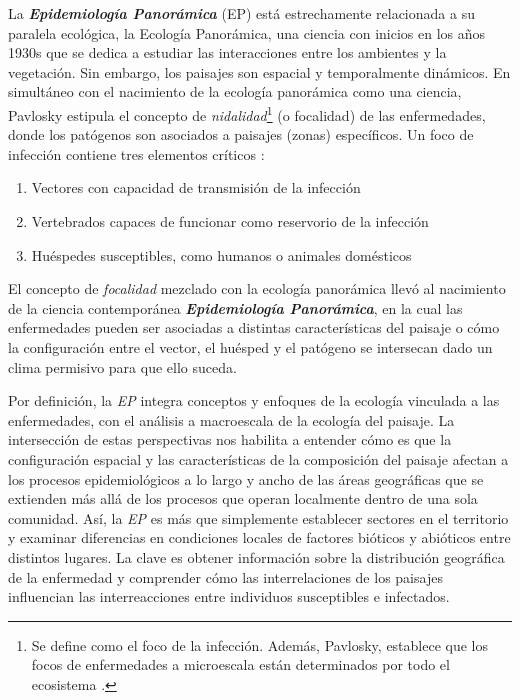   \par La \textbf{\textit{Epidemiología Panorámica}}\cite{nidality, ostfeld_re_emerging}
  (EP) está estrechamente relacionada a su paralela ecológica, la Ecología
  Panorámica, una ciencia con inicios en los años 1930s que se dedica a estudiar
  las interacciones entre los ambientes y la vegetación.
  Sin embargo, los paisajes son espacial y temporalmente dinámicos.
  En simultáneo con el nacimiento de la ecología panorámica como una ciencia,
  Pavlosky estipula el concepto de \textit{nidalidad}\footnote{Se define como
  el foco de la infección. Además, Pavlosky, establece que los focos de
  enfermedades a microescala están determinados por todo el ecosistema \cite{nidality}.}
  (o focalidad) de las enfermedades, donde los patógenos son asociados
  a paisajes (zonas) específicos. Un foco de infección contiene tres elementos
  críticos \cite{reisen_landscape}:
  \begin{enumerate}
    \item Vectores con capacidad de transmisión de la infección
    \item Vertebrados capaces de funcionar como reservorio de la infección
    \item Huéspedes susceptibles, como humanos o animales domésticos
  \end{enumerate}
  El concepto de \textit{focalidad} mezclado con la ecología panorámica
  llevó al nacimiento de la ciencia contemporánea
  \textbf{\textit{Epidemiología Panorámica}}, en la cual las enfermedades
  pueden ser asociadas a distintas características del paisaje o cómo
  la configuración entre el vector, el huésped y el patógeno se intersecan
  dado un clima permisivo para que ello suceda.

\par Por definición, la \textit{EP} integra conceptos y
  enfoques de la ecología vinculada a las enfermedades, con el análisis a
  macroescala de la ecología del paisaje. La intersección de estas perspectivas
  nos habilita a entender cómo es que la configuración espacial y las
  características de la composición del paisaje afectan a los procesos
  epidemiológicos a lo largo y ancho de las áreas geográficas que se
  extienden más allá de los procesos que operan localmente dentro de una sola comunidad.
  Así, la \textit{EP} es más que simplemente establecer
  sectores en el territorio y examinar diferencias en condiciones locales de
  factores bióticos y abióticos entre distintos lugares. La clave es obtener
  información sobre la distribución geográfica de la enfermedad y comprender
  cómo las interrelaciones de los paisajes influencian las interreacciones entre
  individuos susceptibles e infectados.

